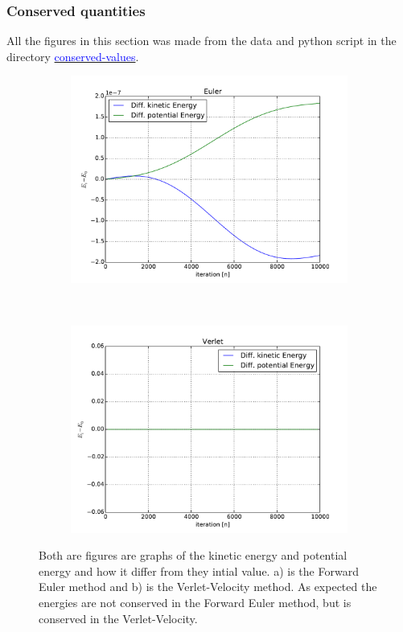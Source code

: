 \subsubsection{Conserved quantities}

All the figures in this section was made from the data and python script in the directory \href{https://github.com/erikfsk/Project-3/tree/master/Project3/conserved-values}{\textcolor{blue}{conserved-values}}.

\begin{figure}[H]
    \centering
    \begin{subfigure}{0.5\textwidth}
        \centering
        \includegraphics[width=\linewidth]{result/bilder/kin-pot-euler.pdf}
    	\caption{}
    \end{subfigure}%
    ~ 
    \begin{subfigure}{0.5\textwidth}
        \centering
        \includegraphics[width=\linewidth]{result/bilder/kin-pot-verlet.pdf}
        \caption{}
    \end{subfigure}
    \caption{Both are figures are graphs of the kinetic energy and potential energy and how it differ from they intial value. a) is the Forward Euler method and b) is the Verlet-Velocity method. As expected the energies are not conserved in the Forward Euler method, but is conserved in the Verlet-Velocity.}
    \label{fig:conserved-energy}
\end{figure}
